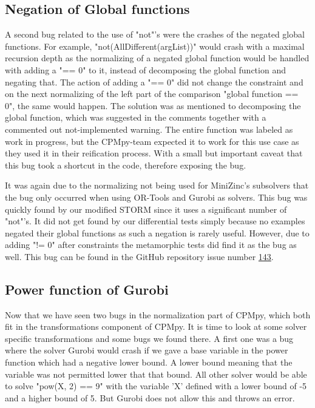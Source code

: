 \subsection{Negation of Global functions}
\label{res:bug:NegatedGlobal}
A second bug related to the use of "not"'s were the crashes of the negated global functions. For example, "not(AllDifferent(argList))" would crash with a maximal recursion depth as the normalizing of a negated global function would be handled with adding a "== 0" to it, instead of decomposing the global function and negating that. The action of adding a "== 0" did not change the constraint and on the next normalizing of the left part of the comparison "global function == 0", the same would happen. The solution was as mentioned to decomposing the global function, which was suggested in the comments together with a commented out not-implemented warning. The entire function was labeled as work in progress, but the CPMpy-team expected it to work for this use case as they used it in their reification process. With a small but important caveat that this bug took a shortcut in the code, therefore exposing the bug. 

It was again due to the normalizing not being used for MiniZinc's subsolvers that the bug only occurred when using OR-Tools and Gurobi as solvers. This bug was quickly found by our modified STORM since it uses a significant number of "not"'s. It did not get found by our differential tests simply because no examples negated their global functions as such a negation is rarely useful. However, due to adding "!= 0" after constraints the metamorphic tests did find it as the bug as well. This bug can be found in the GitHub repository issue number  \href{https://github.com/CPMpy/cpmpy/issues/143}{143}.

\subsection{Power function of Gurobi}
\label{res:bug:Power}
Now that we have seen two bugs in the normalization part of CPMpy, which both fit in the transformations component of CPMpy. It is time to look at some solver specific transformations and some bugs we found there. A first one was a bug where the solver Gurobi would crash if we gave a base variable in the power function which had a negative lower bound. A lower bound meaning that the variable was not permitted lower that that bound. All other solver would be able to solve "pow(X, 2) == 9" with the variable 'X' defined with a lower bound of -5 and a higher bound of 5. But Gurobi does not allow this and throws an error.

